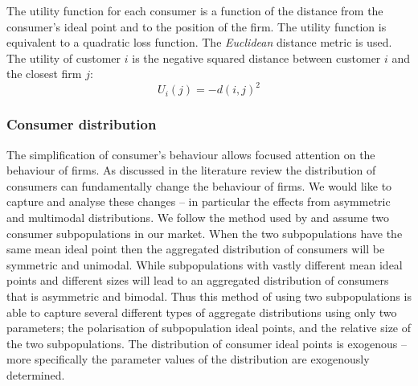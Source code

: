 \documentclass[preprint, 12pt]{elsarticle}
\begin{document}
The utility function for each consumer is a function of the distance from the consumer's ideal point and to the position of the firm. The utility function is equivalent to a quadratic loss function. The \emph{Euclidean} distance metric is used. The utility of customer $i$ is the negative squared distance between customer $i$ and the closest firm $j$:
\begin{equation}
	U_i(j) = -d(i,j)^2
	\label{eq:utility}
\end{equation}

\subsubsection{Consumer distribution}

The simplification of consumer's behaviour allows focused attention on the behaviour of firms. As discussed in the literature review the distribution of consumers can fundamentally change the behaviour of firms. We would like to capture and analyse these changes -- in particular the effects from asymmetric and multimodal distributions. We follow the method used by \citet{Laver_Sergenti_2011} and assume two consumer subpopulations in our market. When the two subpopulations have the same mean ideal point then the aggregated distribution of consumers will be symmetric and unimodal. While subpopulations with vastly different mean ideal points and different sizes will lead to an aggregated distribution of consumers that is asymmetric and bimodal. Thus this method of using two subpopulations is able to capture several different types of aggregate distributions using only two parameters; the polarisation of subpopulation ideal points, and the relative size of the two subpopulations. The distribution of consumer ideal points is exogenous -- more specifically the parameter values of the distribution are exogenously determined.
\end{document}
